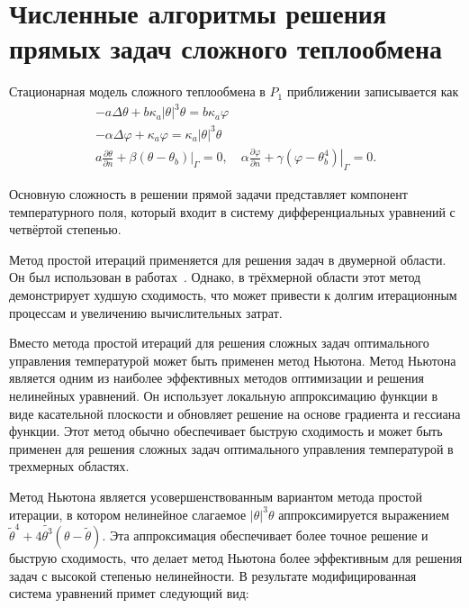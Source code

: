 \section{Численные алгоритмы решения прямых задач сложного теплообмена}\label{sec:ch4/sec1}
Стационарная модель сложного теплообмена в $P_1$ приближении записывается как
\[
    \begin{gathered}
        -a \Delta \theta+b \kappa_{a}| \theta|^{3} \theta = b \kappa_{a} \varphi \\
        -\alpha \Delta \varphi+\kappa_{a} \varphi = \kappa_{a}|\theta|^{3} \theta \\
        a \frac{\partial \theta}{\partial n}
        +\left.\beta\left(\theta-\theta_{b}\right)\right|_{\Gamma}=0,
        \quad \alpha \frac{\partial \varphi}{\partial n}
        +\left.\gamma\left(\varphi-\theta_{b}^{4}\right)\right|_{\Gamma}=0.
    \end{gathered}
\]

Основную сложность в решении прямой задачи представляет компонент
температурного поля, который входит в систему дифференциальных уравнений с четвёртой степенью.

Метод простой итераций применяется для решения задач в двумерной области.
Он был использован в работах~\cite{astrakhantseva2014numerical, Kovtanyuk2015}.
Однако, в трёхмерной области этот метод демонстрирует худшую сходимость,
что может привести к долгим итерационным процессам и увеличению вычислительных затрат.

Вместо метода простой итераций для решения сложных задач оптимального управления
температурой может быть применен метод Ньютона.
Метод Ньютона является одним из наиболее эффективных методов оптимизации
и решения нелинейных уравнений.
Он использует локальную аппроксимацию функции в виде касательной плоскости
и обновляет решение на основе градиента и гессиана функции.
Этот метод обычно обеспечивает быструю сходимость и может быть
применен для решения сложных задач оптимального управления температурой в трехмерных областях.


Метод Ньютона является усовершенствованным вариантом метода простой итерации,
в котором нелинейное слагаемое $|\theta|^3 \theta$ аппроксимируется
выражением $\widetilde{\theta}^4+4 \widetilde{\theta^3}(\theta-\widetilde{\theta})$.
Эта аппроксимация обеспечивает более точное решение и быструю сходимость,
что делает метод Ньютона более эффективным для решения задач с высокой степенью нелинейности.
В результате модифицированная система уравнений примет следующий вид:

